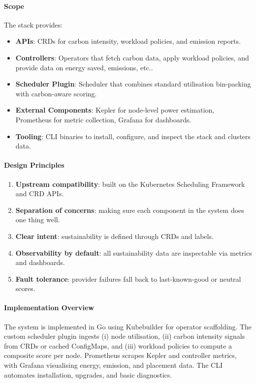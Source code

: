 \documentclass{article}
\begin{document}
\paragraph{Scope}
The stack provides:
\begin{itemize}
  \item \textbf{APIs}: CRDs for carbon intensity, workload policies, and emission reports.
  \item \textbf{Controllers}: Operators that fetch carbon data, apply workload policies, and provide data on energy saved, emissions, etc..
  \item \textbf{Scheduler Plugin}: Scheduler that combines standard utilisation bin-packing with carbon-aware scoring.
  \item \textbf{External Components}: Kepler for node-level power estimation, Prometheus for metric collection, Grafana for dashboards.
  \item \textbf{Tooling}: CLI binaries to install, configure, and inspect the stack and clusters data.
\end{itemize}

\paragraph{Design Principles}
\begin{enumerate}
  \item \textbf{Upstream compatibility}: built on the Kubernetes Scheduling Framework and CRD APIs.
  \item \textbf{Separation of concerns}: making sure each component in the system does one thing well.
  \item \textbf{Clear intent}: sustainability is defined through CRDs and labels.
  \item \textbf{Observability by default}: all sustainability data are inspectable via metrics and dashboards.
  \item \textbf{Fault tolerance}: provider failures fall back to last-known-good or neutral scores.
\end{enumerate}

\paragraph{Implementation Overview}
The system is implemented in Go using Kubebuilder for operator scaffolding. The custom scheduler plugin ingests
(i) node utilisation, (ii) carbon intensity signals from CRDs or cached ConfigMaps, and (iii) workload policies
to compute a composite score per node. Prometheus scrapes Kepler and controller metrics, with Grafana visualising energy,
emission, and placement data. The CLI automates installation, upgrades, and basic diagnostics.
\end{document}
